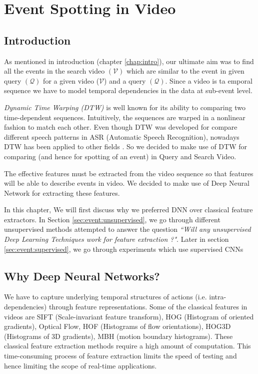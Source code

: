 \chapter{Event Spotting in Video}
\label{chap:event}

\section{Introduction}
As mentioned in introduction (chapter \ref{chap:intro}), our ultimate aim was to find all the events in the search video $(\mathcal{V})$ which are similar to the event in given query $(\mathcal{Q})$  for a given video ($\mathcal{V}$) and a query $(\mathcal{Q})$. Since a video is ta emporal sequence we have to model temporal dependencies
in the data at sub-event level. 

\textit{Dynamic Time Warping (DTW)} is well known for its ability to comparing two time-dependent sequences. Intuitively, the sequences are warped in a nonlinear fashion to match each other. Even though DTW was developed for compare different speech patterns in ASR (Automatic Speech Recognition), nowadays DTW has been applied to other fields \cite{muller2007information}.  So we decided to make use of DTW for comparing (and hence for spotting of an event) in Query and Search Video.

The effective features must be extracted from the video sequence so that features will be able to describe events in video. We decided to make use of Deep Neural Network for extracting these features. 

In this chapter, We will first discuss why we preferred  DNN over classical feature extractors. In Section \ref{sec:event:unsupervised}, we go through different unsupervised methods attempted to answer the question \textit{``Will any unsupervised Deep Learning Techniques work for feature extraction ?"}. Later in section \ref{sec:event:supervised}, we go through experiments which use supervised CNNs  

\section{Why Deep Neural Networks?}
\label{sec:event:why}
We have to capture underlying temporal structures of actions (i.e. intra-dependencies) through feature representations. Some of the classical features in videos are SIFT (Scale-invariant feature transform), HOG (Histogram of oriented gradients), Optical Flow, HOF (Histograms of flow orientations), HOG3D (Histograms of 3D gradients), MBH (motion boundary histograms). These classical feature extraction methods require a high amount of computation\cite{baker2011database,chatfield2011devil}. This time-consuming process of feature extraction limits the speed of testing and hence limiting the scope of real-time applications.


